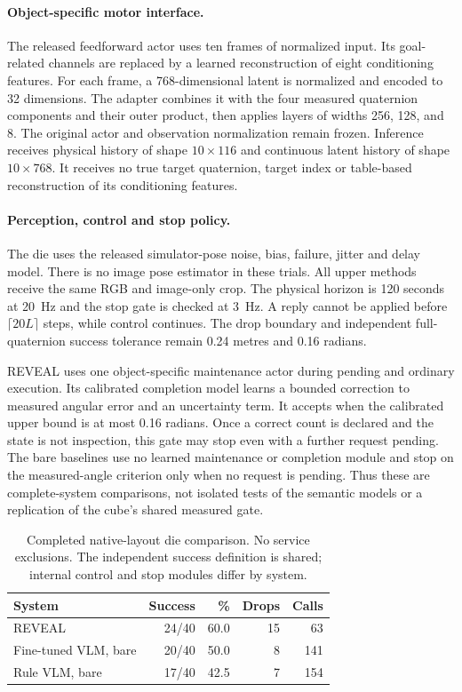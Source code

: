 \paragraph{Object-specific motor interface.}
The released feedforward actor uses ten frames of normalized input. Its goal-related channels are replaced by a learned reconstruction of eight conditioning features. For each frame, a 768-dimensional latent is normalized and encoded to 32 dimensions. The adapter combines it with the four measured quaternion components and their outer product, then applies layers of widths 256, 128, and 8. The original actor and observation normalization remain frozen. Inference receives physical history of shape $10\times116$ and continuous latent history of shape $10\times768$. It receives no true target quaternion, target index or table-based reconstruction of its conditioning features.

\paragraph{Perception, control and stop policy.}
The die uses the released simulator-pose noise, bias, failure, jitter and delay model. There is no image pose estimator in these trials. All upper methods receive the same RGB and image-only crop. The physical horizon is 120 seconds at 20~Hz and the stop gate is checked at 3~Hz. A reply cannot be applied before $\lceil20L\rceil$ steps, while control continues. The drop boundary and independent full-quaternion success tolerance remain 0.24 metres and 0.16 radians.

REVEAL uses one object-specific maintenance actor during pending and ordinary execution. Its calibrated completion model learns a bounded correction to measured angular error and an uncertainty term. It accepts when the calibrated upper bound is at most 0.16 radians. Once a correct count is declared and the state is not inspection, this gate may stop even with a further request pending. The bare baselines use no learned maintenance or completion module and stop on the measured-angle criterion only when no request is pending. Thus these are complete-system comparisons, not isolated tests of the semantic models or a replication of the cube's shared measured gate.

\begin{table}[t]
\centering\small
\begin{tabular}{lrrrr}
\toprule
System & Success & \% & Drops & Calls\\
\midrule
REVEAL & 24/40 & 60.0 & 15 & 63\\
Fine-tuned VLM, bare & 20/40 & 50.0 & 8 & 141\\
Rule VLM, bare & 17/40 & 42.5 & 7 & 154\\
\bottomrule
\end{tabular}
\caption{Completed native-layout die comparison. No service exclusions. The independent success definition is shared; internal control and stop modules differ by system.}
\end{table}

